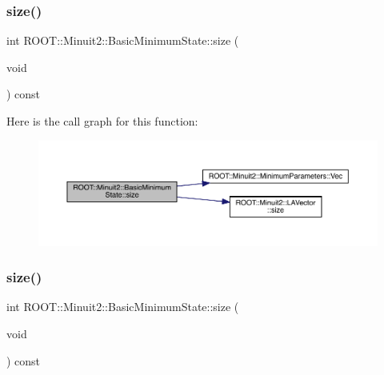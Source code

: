 \mbox{\label{classROOT_1_1Minuit2_1_1BasicMinimumState_a12c3b0b51b127384c53029c54c984590}} 
\subsubsection{\texorpdfstring{size()}{size()}\hspace{0.1cm}{\footnotesize\ttfamily [1/3]}}
{\footnotesize\ttfamily int R\+O\+O\+T\+::\+Minuit2\+::\+Basic\+Minimum\+State\+::size (\begin{DoxyParamCaption}\item[{void}]{ }\end{DoxyParamCaption}) const\hspace{0.3cm}{\ttfamily [inline]}}

Here is the call graph for this function\+:
\nopagebreak
\begin{figure}[H]
\begin{center}
\leavevmode
\includegraphics[width=350pt]{d0/db1/classROOT_1_1Minuit2_1_1BasicMinimumState_a12c3b0b51b127384c53029c54c984590_cgraph}
\end{center}
\end{figure}
\mbox{\label{classROOT_1_1Minuit2_1_1BasicMinimumState_a12c3b0b51b127384c53029c54c984590}} 
\subsubsection{\texorpdfstring{size()}{size()}\hspace{0.1cm}{\footnotesize\ttfamily [2/3]}}
{\footnotesize\ttfamily int R\+O\+O\+T\+::\+Minuit2\+::\+Basic\+Minimum\+State\+::size (\begin{DoxyParamCaption}\item[{void}]{ }\end{DoxyParamCaption}) const\hspace{0.3cm}{\ttfamily [inline]}}

